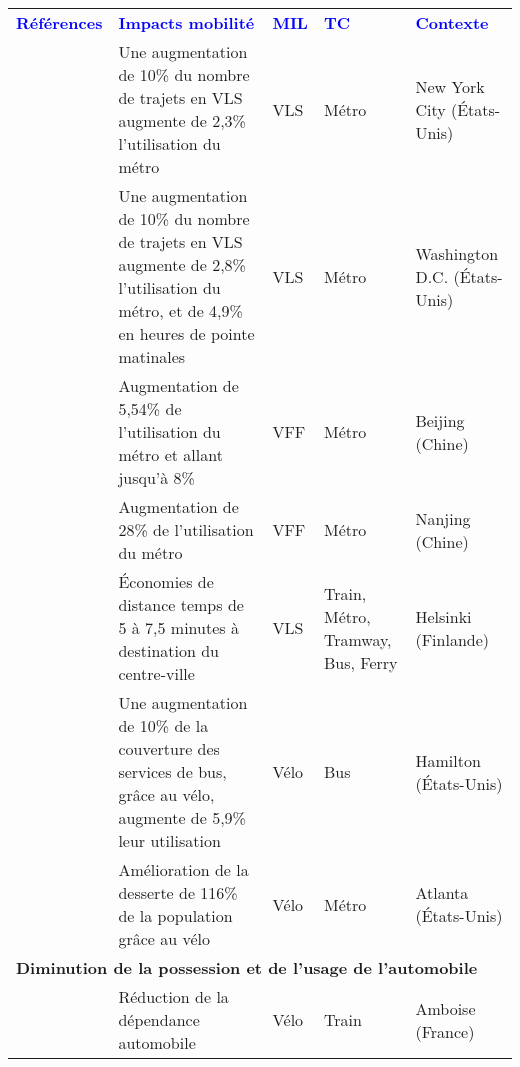         \begin{longtable}{p{3cm}p{4cm}p{1.5cm}p{1.8cm}p{2.3cm}}
        \hline
        \textcolor{blue}{\textbf{Références}} & \textcolor{blue}{\textbf{Impacts mobilité}} & \textcolor{blue}{\textbf{MIL}} & \textcolor{blue}{\textbf{TC}} & \textcolor{blue}{\textbf{Contexte}}
        \hline
        \endhead
\multicolumn{5}{l}{\textbf{Amélioration de la fréquentation des transports en commun}}\\
    \small{\textcite{ashraf_impacts_2021}}\index{Ashraf, Md Tanvir|pagebf} & \small{Une augmentation de 10\% du nombre de trajets en VLS augmente de 2,3\% l'utilisation du métro} & \small{VLS} & \small{Métro} & \small{New York City (États-Unis)}\\
    \small{\textcite{ma_bicycle_2015}}\index{Ma, Ting|pagebf} & \small{Une augmentation de 10\% du nombre de trajets en VLS augmente de 2,8\% l'utilisation du métro, et de 4,9\% en heures de pointe matinales} & \small{VLS} & \small{Métro} & \small{Washington D.C. (États-Unis)}\\
    \small{\textcite{fan_dockless_2020}}\index{Fan, Yichun|pagebf} & \small{Augmentation de 5,54\% de l'utilisation du métro et allant jusqu'à 8\%} & \small{VFF} & \small{Métro} & \small{Beijing (Chine)}\\
    \small{\textcite{yang_spatiotemporal_2019}}\index{Yang, Yuanxuan|pagebf} & \small{Augmentation de 28\% de l'utilisation du métro} & \small{VFF} & \small{Métro} & \small{Nanjing (Chine)}\\
    \small{\textcite{jappinen_modelling_2013}}\index{Jäppinen, Sakari|pagebf} & \small{Économies de distance temps de 5 à 7,5 minutes à destination du centre-ville} & \small{VLS} & \small{Train, Métro, Tramway, Bus, Ferry} & \small{Helsinki (Finlande)}\\
    \small{\textcite{zuo_promote_2020}}\index{Zuo, Ting|pagebf} & \small{Une augmentation de 10\% de la couverture des services de bus, grâce au vélo, augmente de 5,9\% leur utilisation} & \small{Vélo} & \small{Bus} & \small{Hamilton (États-Unis)}\\
    \small{\textcite{bearn_adaption_2018}}\index{Bearn, Cary|pagebf} & \small{Amélioration de la desserte de 116\% de la population grâce au vélo} & \small{Vélo} & \small{Métro} & \small{Atlanta (États-Unis)}\\
    \hline
\multicolumn{5}{l}{\textbf{Diminution de la possession et de l'usage de l'automobile}}\\
    \small{\textcite{papon_evaluation_2017}}\index{Papon, Francis|pagebf} & \small{Réduction de la dépendance automobile} & \small{Vélo} & \small{Train} & \small{Amboise (France)}\\

\end{longtable}
